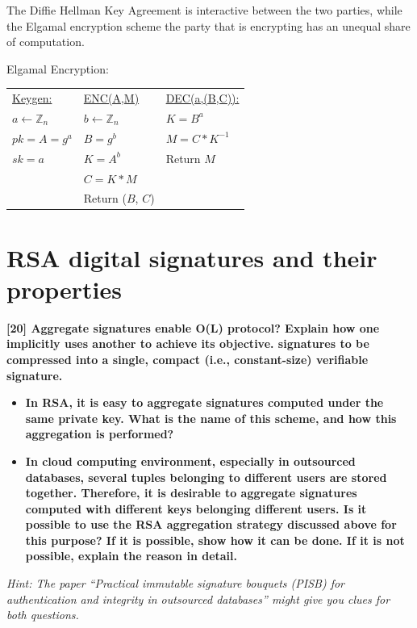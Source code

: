 \documentclass[letterpaper,11pt,notitlepage,fleqn]{article}
\begin{document}
The Diffie Hellman Key Agreement is interactive between the two parties, while the Elgamal encryption scheme the party that is encrypting has an unequal share of computation. 

\noindent Elgamal Encryption: \\
\begin{tabular}{l l l}
    \underline{Keygen:} & \underline{ENC(A,M)} & \underline{DEC(a,(B,C)):} \\ 
    $a \leftarrow \mathbb{Z}_{n}$ & $b \leftarrow \mathbb{Z}_{n}$ & $K = B^a$ \\
    $pk = A = g^a$ & $B = g^b$ & $M = C \ast K^{-1}$ \\
    $sk = a$ & $K = A^b$ & Return $M$ \\
    & $C = K \ast M$ & \\
    & Return ($B$, $C$) &
    
\end{tabular}


\section{RSA digital signatures and their properties}
\noindent \textbf{[20] Aggregate  signatures  enable  O(L) 
protocol? Explain how one implicitly uses another to achieve its objective.  
signatures to be compressed into a single, compact (i.e., constant-size) verifiable signature.}
\begin{itemize}
    \item \textbf{In  RSA,  it  is  easy  to  aggregate  signatures  computed  under  the  same  private key. What is the name of this scheme, and how this aggregation is performed?}
    \item \textbf{In cloud computing environment, especially  in outsourced databases, several tuples  belonging  to  different  users  are  stored  together.  Therefore,  it  is desirable  to  aggregate  signatures  computed  with  different  keys  belonging different  users.  Is  it  possible  to  use  the  RSA  aggregation  strategy  discussed above  for  this  purpose?  If  it  is  possible,  show  how  it  can  be  done.  If  it  is  not possible, explain the reason in
        detail.}
\end{itemize}
\textit{Hint:  The  paper  “Practical  immutable  signature  bouquets  (PISB)  for authentication and integrity in outsourced databases” might give you clues for both questions.}
\end{document}

